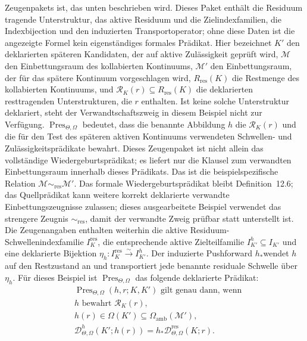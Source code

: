Zeugenpakets ist, das unten beschrieben wird. Dieses Paket enthält die Residuum tragende Unterstruktur, das
aktive Residuum und die Zielindexfamilien, die Indexbijection und den induzierten Transportoperator; ohne diese
Daten ist die angezeigte Formel kein eigenständiges formales Prädikat.
Hier bezeichnet \(K'\) den deklarierten späteren Kandidaten, der auf aktive Zulässigkeit geprüft wird,
\(\mathcal{M}\) den Einbettungsraum des kollabierten Kontinuums,
\(\mathcal{M}'\) den Einbettungsraum, der für das spätere Kontinuum vorgeschlagen wird,
\(R_{\mathrm{res}}(K)\) die Restmenge des kollabierten Kontinuums, und
\(\mathcal{R}_K(r)\subseteq R_{\mathrm{res}}(K)\) die deklarierten resttragenden Unterstrukturen, die
\(r\) enthalten. Ist keine solche Unterstruktur deklariert, steht der Verwandtschaftszweig in diesem
Beispiel nicht zur Verfügung.
\(\operatorname{Pres}_{\Theta,\Omega}\) bedeutet, dass die benannte Abbildung \(h\) die
\(\mathcal{R}_K(r)\) und die für den Test des späteren aktiven Kontinuums verwendeten Schwellen- und
Zulässigkeitsprädikate bewahrt. Dieses Zeugenpaket ist nicht allein das vollständige Wiedergeburtsprädikat;
es liefert nur die Klausel zum verwandten Einbettungsraum innerhalb dieses Prädikats. Das ist die
beispielspezifische Relation
\(\mathcal{M}\sim_{\mathrm{res}}\mathcal{M}'\). Das formale Wiedergeburtsprädikat bleibt
Definition~12.6; das Quellprädikat kann weitere korrekt deklarierte verwandte Einbettungszeugnisse
zulassen; dieses ausgearbeitete Beispiel verwendet das strengere Zeugnis \(\sim_{\mathrm{res}}\), damit der
verwandte Zweig prüfbar statt unterstellt ist.
Die Zeugenangaben enthalten weiterhin die aktive Residuum-Schwellenindexfamilie
\(I_K^{\mathrm{res}}\), die entsprechende aktive Zielteilfamilie
\(I_{K'}^{h}\subseteq I_{K'}\) und eine deklarierte Bijektion
\(\eta_h:I_K^{\mathrm{res}}\xrightarrow{\sim}I_{K'}^{h}\). Der induzierte Pushforward \(h_\ast\)wendet
\(h\) auf den Restzustand an und transportiert jede benannte residuale Schwelle über \(\eta_h\).
Für dieses Beispiel ist \(\operatorname{Pres}_{\Theta,\Omega}\) das folgende deklarierte Prädikat:
\[
\begin{aligned}
&\operatorname{Pres}_{\Theta,\Omega}(h,r;K,K')
  \text{ gilt genau dann, wenn}\\
&h \text{ bewahrt } \mathcal{R}_K(r),\\
&h(r)\in\Omega(K')\subseteq\Omega_{\mathrm{amb}}(\mathcal{M}'),\\
&\mathcal{D}^{h}_{\Theta,\Omega}(K';h(r))
  =h_{\ast}\mathcal{D}^{\mathrm{res}}_{\Theta,\Omega}(K;r).
\end{aligned}
\]
